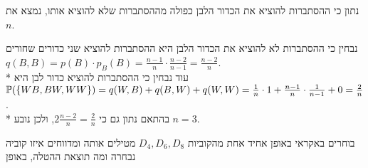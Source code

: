 \Subquestion{}
נתון כי ההסתברות להוציא את הכדור הלבן כפולה מההסתברות שלא להוציא אותו, נמצא את $n$.
\begin{solution}
	נבחין כי ההסתברות לא להוציא את הכדור הלבן היא ההסתברות להוציא שני כדורים שחורים $q(B, B) = p(B) \cdot p_B(B) = \frac{n - 1}{n} \cdot \frac{n - 2}{n - 1} = \frac{n - 2}{n}$. \\*
	עוד נבחין כי ההסתברות להוציא כדור לבן היא $\mathbb{P}(\{ WB, BW, WW \}) = q(W, B) + q(B, W) + q(W, W) = \frac{1}{n} \cdot 1 + \frac{n - 1}{n} \cdot \frac{1}{n - 1} + 0 = \frac{2}{n}$. \\*
	בהתאם נתון גם כי $2 \frac{n - 2}{n} = \frac{2}{n}$, ולכן נובע $n = 3$.
\end{solution}

\Question{}
בוחרים באקראי באופן אחיד אחת מהקוביות $D_4, D_6, D_8$ מטילים אותה ומדווחים איזו קוביה נבחרה ומה תוצאת ההטלה, באופן 

